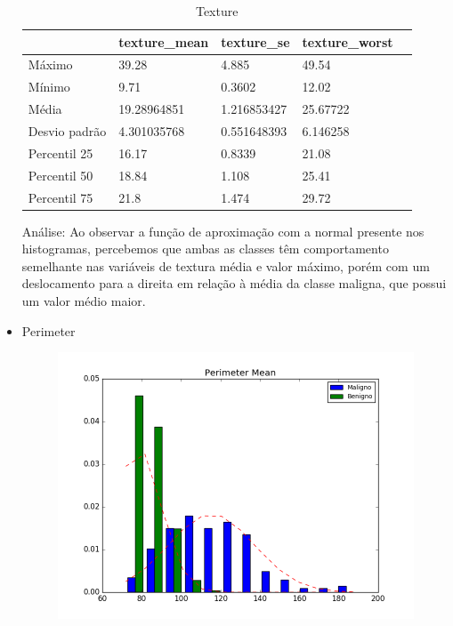 \documentclass[11pt,a4paper]{article}
\numberwithin{equation}{section}
\begin{document}
\begin{itemize}
\begin{table}[H]
\centering
\caption{Texture}
\label{my-label}
\begin{tabular}{lllll}
\hline
              & texture\_mean & texture\_se & texture\_worst &  \\ \hline
Máximo        & 39.28         & 4.885       & 49.54          &  \\
Mínimo        & 9.71          & 0.3602      & 12.02          &  \\
Média         & 19.28964851   & 1.216853427 & 25.67722       &  \\
Desvio padrão & 4.301035768   & 0.551648393 & 6.146258       &  \\
Percentil 25  & 16.17         & 0.8339      & 21.08          &  \\
Percentil 50  & 18.84         & 1.108       & 25.41          &  \\
Percentil 75  & 21.8          & 1.474       & 29.72          & \\ \hline
\end{tabular}
\end{table}

Análise: Ao observar a função de aproximação com a normal presente nos histogramas, percebemos que ambas as classes têm comportamento semelhante nas variáveis de textura média e valor máximo, porém com um deslocamento para a direita em relação à média da classe maligna, que possui um valor médio maior. 


\item Perimeter
\begin{figure}[H]
\centering
  \includegraphics[width=.5\linewidth]{../img/hist/perimeter_mean}
  \label{fig:test1}
\end{figure}%


\end{itemize}
\end{document}
